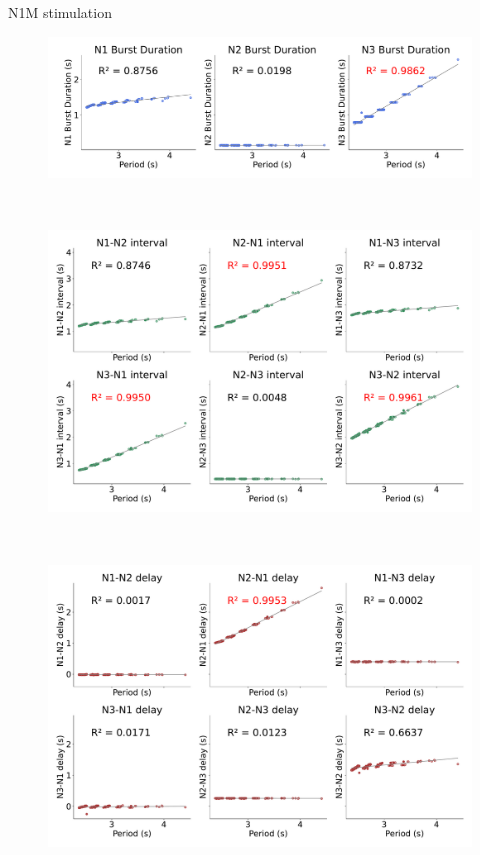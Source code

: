 \documentclass[aspectratio=43]{beamer}
\begin{document}
\begin{frame}{N1M stimulation}
\begin{figure}[hbt!]
\begin{minipage}[b]{0.36\textwidth}
		\end{minipage}
		\begin{minipage}[b]{0.44\textwidth}
			\centering
			\begin{minipage}[b]{\textwidth}
				\centering
				\includegraphics[width=\textwidth]{invariants/data/MODEL/n1m_driven/images/3phases/_durations.pdf}
			\end{minipage}\
			\begin{minipage}[b]{\textwidth}
				\centering
				\includegraphics[width=\textwidth]{invariants/data/MODEL/n1m_driven/images/3phases/_intervals.pdf}
			\end{minipage}\
			\begin{minipage}[b]{\textwidth}
				\centering
				\includegraphics[width=\textwidth]{invariants/data/MODEL/n1m_driven/images/3phases/_delays.pdf}

\end{minipage}
\end{minipage}
\end{figure}
\end{frame}
\end{document}
